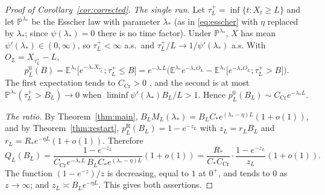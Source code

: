 \documentclass[11pt,a4paper]{article}
\theoremstyle{definition}
\theoremstyle{remark}
\newcommand{\E}{\mathbb E}
\newcommand{\Pp}{\mathbb P}
\newcommand{\1}{\mathbf 1}
\begin{document}
\begin{proof}[Proof of Corollary~\ref{cor:corrected}]
\emph{The single run.} Let $\tau^+_L=\inf\{t:X_t\ge L\}$ and let $\Pp^{\lambda_*}$ be the Esscher law with parameter $\lambda_*$ (as in \eqref{eq:esscher} with $\eta$ replaced by $\lambda_*$; since $\psi(\lambda_*)=0$ there is no time factor). Under $\Pp^{\lambda_*}$, $X$ has mean $\psi'(\lambda_*)\in(0,\infty)$, so $\tau^+_L<\infty$ a.s.\ and $\tau^+_L/L\to1/\psi'(\lambda_*)$ a.s. With $O_L=X_{\tau^+_L}-L$,
\[
 p^0_L(B)=\E^{\lambda_*}\big[e^{-\lambda_*X_{\tau_L^+}};\tau^+_L\le B\big]=e^{-\lambda_*L}\Big(\E^{\lambda_*}e^{-\lambda_*O_L}-\E^{\lambda_*}\big[e^{-\lambda_*O_L};\tau^+_L>B\big]\Big).
\]
The first expectation tends to $C_{\mathrm{Cr}}>0$ \cite{bertoindoney}, and the second is at most $\Pp^{\lambda_*}(\tau^+_L>B_L)\to0$ when $\liminf\psi'(\lambda_*)B_L/L>1$. Hence $p^0_L(B_L)\sim C_{\mathrm{Cr}}e^{-\lambda_*L}$.

\emph{The ratio.} By Theorem~\ref{thm:main}, $B_LM_L(\lambda_*)=B_LC_*e^{(\lambda_*-\eta)L}(1+o(1))$, and by Theorem~\ref{thm:restart}, $p^{\mathrm R}_L(B_L)=1-e^{-z_L}$ with $z_L=r_LB_L$ and $r_L=R_*e^{-\eta L}(1+o(1))$. Therefore
\[
 Q_L(B_L)=\frac{1-e^{-z_L}}{C_{\mathrm{Cr}}e^{-\lambda_*L}\,B_LC_*e^{(\lambda_*-\eta)L}}(1+o(1))=\frac{R_*}{C_*C_{\mathrm{Cr}}}\cdot\frac{1-e^{-z_L}}{z_L}(1+o(1)).
\]
The function $(1-e^{-z})/z$ is decreasing, equal to $1$ at $0^+$, and tends to $0$ as $z\to\infty$; and $z_L\asymp B_Le^{-\eta L}$. This gives both assertions.
\end{proof}

\end{document}
